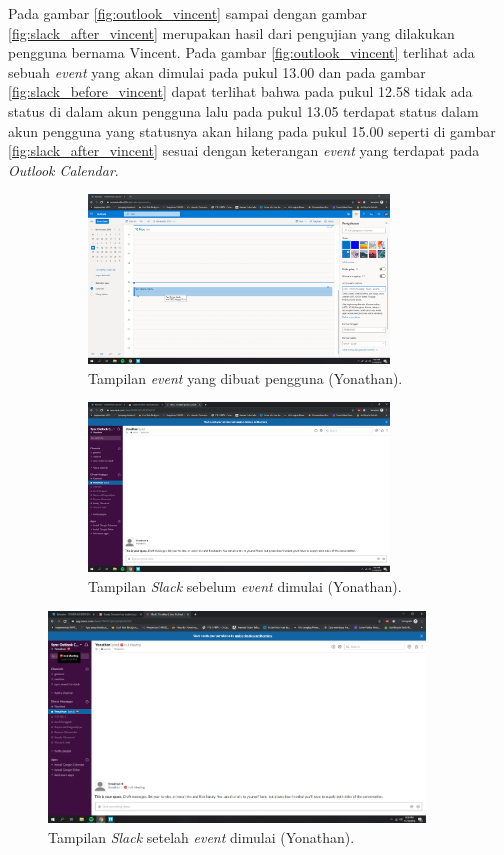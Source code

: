 Pada gambar \ref{fig:outlook_vincent} sampai dengan gambar \ref{fig:slack_after_vincent} merupakan hasil dari pengujian yang dilakukan pengguna bernama Vincent. Pada gambar \ref{fig:outlook_vincent} terlihat ada sebuah \textit{event} yang akan dimulai pada pukul 13.00 dan pada gambar \ref{fig:slack_before_vincent} dapat terlihat bahwa pada pukul 12.58 tidak ada status di dalam akun pengguna lalu pada pukul 13.05 terdapat status dalam akun pengguna yang statusnya akan hilang pada pukul 15.00 seperti di gambar \ref{fig:slack_after_vincent} sesuai dengan keterangan \textit{event} yang terdapat pada \textit{Outlook Calendar}.

\begin{figure}[h]
\begin{subfigure}{8.5cm}
  \centering
  \includegraphics[width=8cm]{./Gambar/PengujianYonathan/Outlook.png}
  \caption{Tampilan \textit{event} yang dibuat pengguna (Yonathan).}
  \label{fig:outlook_yonathan}
\end{subfigure}
\begin{subfigure}{8.5cm}
  \centering
  \includegraphics[width=8cm]{./Gambar/PengujianYonathan/Slack_Before.png}
  \caption{Tampilan \textit{Slack} sebelum \textit{event} dimulai (Yonathan).}
  \label{fig:slack_before_yonathan}
\end{subfigure}
\caption{}
\end{figure}

\begin{figure}[h]
  \includegraphics[width=10cm]{./Gambar/PengujianYonathan/Slack_After.png}
  \centering
  \caption{Tampilan \textit{Slack} setelah \textit{event} dimulai (Yonathan).}
  \label{fig:slack_after_yonathan}
\end{figure}

